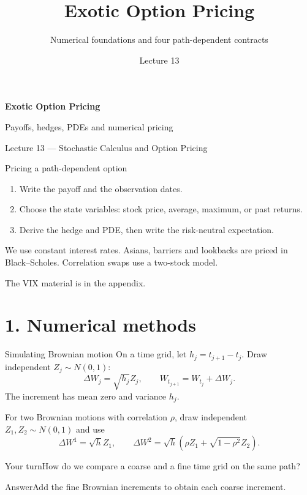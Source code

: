 \documentclass[handout,10pt,t,aspectratio=169]{beamer}
\title{Exotic Option Pricing}
\subtitle{Numerical foundations and four path-dependent contracts}
\author{}\date{Lecture 13}
\newenvironment{pausebox}{\begin{block}{Your turn}}{\end{block}}
\newenvironment{answerbox}{\begin{exampleblock}{Answer}}{\end{exampleblock}}
\begin{document}
\begin{frame}[plain]\vfill
{\LARGE\bfseries\color{CourseBlue}Exotic Option Pricing\par}
\medskip{\color{CourseGold}\rule{.94\textwidth}{.8pt}}
\medskip Payoffs, hedges, PDEs and numerical pricing\par
\medskip Lecture 13 --- Stochastic Calculus and Option Pricing\vfill
\end{frame}

\begin{frame}{Pricing a path-dependent option}
\small
\begin{enumerate}
\item Write the payoff and the observation dates.
\item Choose the state variables: stock price, average, maximum, or past returns.
\item Derive the hedge and PDE, then write the risk-neutral expectation.
\end{enumerate}
We use constant interest rates. Asians, barriers and lookbacks are priced
in Black--Scholes. Correlation swaps use a two-stock model.

\medskip
The VIX material is in the appendix.
\end{frame}

\section{1. Numerical methods}


\begin{frame}{Simulating Brownian motion}
\small
On a time grid, let \(h_j=t_{j+1}-t_j\). Draw independent \(Z_j\sim N(0,1)\):
\[
 \Delta W_j=\sqrt{h_j}Z_j,\qquad W_{t_{j+1}}=W_{t_j}+\Delta W_j.
\]
The increment has mean zero and variance \(h_j\).

\medskip
For two Brownian motions with correlation \(\rho\), draw independent
\(Z_1,Z_2\sim N(0,1)\) and use
\[
 \Delta W^1=\sqrt h Z_1,\qquad
 \Delta W^2=\sqrt h(\rho Z_1+\sqrt{1-\rho^2}Z_2).
\]
\begin{pausebox}How do we compare a coarse and a fine time grid on the same path?\end{pausebox}
\begin{answerbox}Add the fine Brownian increments to obtain each coarse increment.\end{answerbox}
\end{frame}
\end{document}
